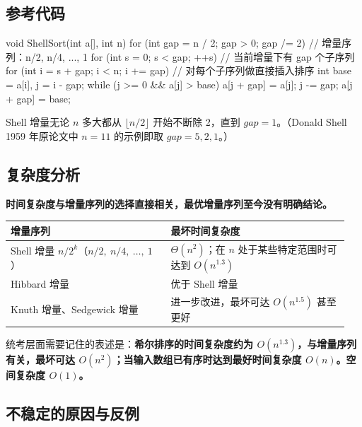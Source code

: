 \documentclass[11pt,openany,UTF8]{ctexbook}
\begin{document}
\subsection{参考代码}

\begin{codebox}
void ShellSort(int a[], int n) {
    for (int gap = n / 2; gap > 0; gap /= 2) {      // 增量序列：n/2, n/4, ..., 1
        for (int s = 0; s < gap; ++s) {             // 当前增量下有 gap 个子序列
            for (int i = s + gap; i < n; i += gap) {// 对每个子序列做直接插入排序
                int base = a[i], j = i - gap;
                while (j >= 0 && a[j] > base) {
                    a[j + gap] = a[j];
                    j -= gap;
                }
                a[j + gap] = base;
            }
        }
    }
}
\end{codebox}

Shell 增量无论 $n$ 多大都从 $\lfloor n/2\rfloor$ 开始不断除 2，直到 $gap=1$。（Donald Shell 1959 年原论文中 $n=11$ 的示例即取 $gap=5,2,1$。）

\subsection{复杂度分析}

\textbf{时间复杂度与增量序列的选择直接相关，最优增量序列至今没有明确结论。}

\begingroup\small\setlength{\tabcolsep}{4.0pt}
\begin{longtable}{@{}L{0.4485\linewidth}L{0.4972\linewidth}@{}}
\toprule
\textbf{增量序列} & \textbf{最坏时间复杂度} \\
\midrule
\endhead
Shell 增量 $n/2^k$（$n/2,\allowbreak\ n/4,\allowbreak\ \dots,\allowbreak\ 1$） & $\Theta(n^2)$；在 $n$ 处于某些特定范围时可达到 $O(n^{1.3})$ \\
Hibbard 增量 & 优于 Shell 增量 \\
Knuth 增量、Sedgewick 增量 & 进一步改进，最坏可达 $O(n^{1.5})$ 甚至更好 \\
\bottomrule
\end{longtable}
\endgroup

统考层面需要记住的表述是：\textbf{希尔排序的时间复杂度约为 $O(n^{1.3})$，与增量序列有关，最坏可达 $O(n^2)$；当输入数组已有序时达到最好时间复杂度 $O(n)$。空间复杂度 $O(1)$。}

\subsection{不稳定的原因与反例}
\end{document}
